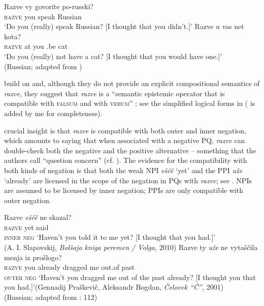 \documentclass[output=paper,colorlinks,citecolor=brown]{langscibook}
\begin{document}
\ea\label{sim:ex:razve}\ea\gll Razve vy govorite po-russki?\label{sim:ex:razve-a}\\
\textsc{razve} you speak Russian\\
\glt `Do you (really) speak Russian? [I thought that you didn't.]'
\ex\gll Razve u vas net kota?\\
\textsc{razve} at you {\NEG}.be cat\\
\glt `Do you (really) not have a cat? [I thought that you would have one.]'\\
\hfill (Russian; adapted from \citealt{Korotkova2023})
\z\z

\noindent\citet{Repp.Geist2025} build on \citet{Repp2006,Repp2009,Repp2013} and, although they do not provide an explicit compositional semantics of \textit{razve,} they suggest that \textit{razve} is a ``semantic epistemic operator that is compatible with \textsc{falsum} and with \textsc{verum}'' \citep[133]{Repp.Geist2025}; see the simplified logical forms in  ( is added by me for completeness).

\ea\label{sim:lf:repp-geist}
\z\z

\noindent {} crucial insight is that \textit{razve} is compatible with both outer and inner negation, which amounts to saying that when associated with a negative PQ, \textit{razve} can double-check both the negative and the positive alternative -- something that the authors call ``question concern'' (cf. ). The evidence for the compatibility with both kinds of negation is that both the weak NPI \textit{ešč\"{e}} `yet' and the PPI \textit{uže} `already' are licensed in the scope of the negation in PQs with \textit{razve}; see . NPIs are assumed to be licensed by inner negation; PPIs are only compatible with outer negation.

\ea\label{sim:ex:razve-npi-ppi}\ea\gll Razve \textit{ešč\"{e}} ne skazal?\label{sim:ex:razve-npi}\\
\textsc{razve} yet {\NEG} said\\\hfill\textsc{inner neg}
\glt `Haven't you told it to me yet? [I thought that you had.]'\\\hfill (A. I. Slapovskij, \textit{Bolšaja kniga peremen / Volga,} 2010)
\ex\gll Razve ty \textit{uže} ne vytaščila menja iz prošlogo?\label{sim:ex:razve-ppi}\\
\textsc{razve} you already {\NEG} dragged me out.of past\\\hfill \textsc{outer neg}
\glt `Haven't you dragged me out of the past already? [I thought you that you had.]'\hfill (Gennadij Praškevič, Aleksandr Bogdan, \textit{Čelovek ``Č'',} 2001)\\\hfill (Russian; adapted from \citealt{Repp.Geist2025}: 112)
\z\z
\end{document}
